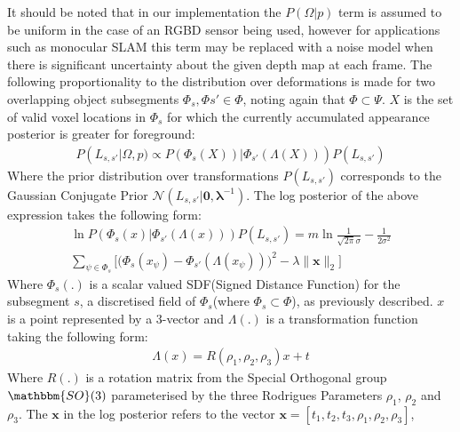 It should be noted that in our implementation the $P(\Omega | p)$ term is assumed to be uniform in the case of an 
RGBD sensor being used, however for applications such as monocular SLAM this term may be replaced with a noise model when there is 
significant uncertainty about the given depth map at each frame.
The following proportionality to the distribution over deformations is made for two overlapping object subsegments $\Phi_{s}, \Phi{s'} \in \Phi$, noting again that 
$\Phi \subset \Psi$. $X$ is the set of valid voxel locations in $\Phi_{s}$ for which the currently accumulated appearance posterior is greater for foreground:
\begin{equation}
\begin{split}
P(L_{s, s'} | \Omega, p) \propto P(\Phi_{s}(X)) | \Phi_{s'}(\Lambda(X)))P(L_{s, s'})
\end{split}
\end{equation}
Where the prior distribution over transformations $P(L_{s, s'})$ corresponds to the Gaussian Conjugate Prior $\mathcal{N}(L_{s, s'} | \mathbf{0}, \mathbf{\lambda}^{-1})$.
The log posterior of the above expression takes the following form:
\begin{equation}
\label{eq:logPosterior}
\begin{split}
\ln P(\Phi_{s}(x) | \Phi_{s'}(\Lambda(x)))P(L_{s, s'}) = m\ln\frac{1}{\sqrt{2\pi}\sigma} -\frac{1}{2\sigma^2} \\ 
\sum_{\psi \in \Phi_{s}} \Bigg [ \bigg( \Phi_{s}(x_{\psi}) - \Phi_{s'}(\Lambda(x_{\psi})) \bigg)^2  - \lambda \lVert \mathbf{\mathbf{x}} \rVert_{2} \Bigg ]
\end{split}
\end{equation}
Where $\Phi_{s}(.)$ is a scalar valued SDF(Signed Distance Function) for the subsegment $s$, a discretised field of $\Phi_{s}$(where $\Phi_{s} \subset \Phi$), as previously described. $x$ is a point represented by a 3-vector and $\Lambda(.)$ is a transformation function taking the following form:
\begin{equation}
\begin{split}
\Lambda(x) = R(\rho_{1}, \rho_{2}, \rho_{3})x + t
\end{split}
\end{equation}
Where $R(.)$ is a rotation matrix from the Special Orthogonal group $\mathbbm{SO}(3)$ parameterised by the three 
Rodrigues Parameters \cite{Shuster1993} $\rho_{1}$, $\rho_{2}$ and $\rho_{3}$. The $\mathbf{x}$ in the log posterior refers to the vector $\mathbf{x} = [t_{1}, t_{2}, t_{3}, \rho_{1}, \rho_{2}, \rho_{3}]$, 
